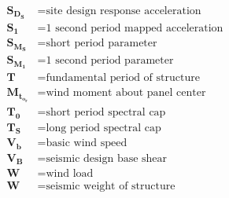 \documentclass[12pt,notitle,letterpaper]{report}
\begin{document}
\begin{align*}
    \bm{S_D_S}   & = \textrm{site design response acceleration}       \\
    \bm{S_1}     & = \textrm{1 second period mapped acceleration}     \\
    \bm{S_M_S}   & = \textrm{short period parameter}                  \\
    \bm{S_M_1}   & = \textrm{1 second period parameter}               \\
    \bm{T}       & = \textrm{fundamental period of structure}         \\
    \bm{M_t_o_r} & = \textrm{wind moment about panel center }         \\
    \bm{T_0}     & = \textrm{short period spectral cap }              \\
    \bm{T_S}     & = \textrm{long period spectral cap}                \\
    \bm{V_b}     & = \textrm{basic wind speed}                        \\
    \bm{V_B}     & = \textrm{seismic design base shear}               \\
    \bm{W}       & = \textrm{wind load}                               \\
    \bm{W}       & = \textrm{seismic weight of structure }            \\
\end{align*}
\endgroup
\end{document}
